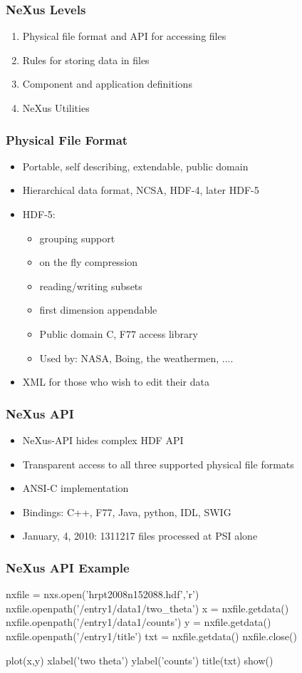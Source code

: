 \documentclass{beamer}
\begin{document}
\begin{frame}
 \frametitle{NeXus Levels }
\begin{enumerate}
\item Physical file format and API for accessing files
\item Rules for storing data in files
\item Component and application definitions
\item NeXus Utilities
\end{enumerate}
\end{frame}


\begin{frame} \frametitle{Physical File Format }
\begin{itemize}
\item Portable, self describing, extendable, public domain
\item Hierarchical data format, NCSA, HDF-4, later HDF-5
\item HDF-5:
\begin{itemize}
\item grouping support
\item on the fly compression
\item reading/writing subsets
\item first dimension appendable
\item Public domain C, F77 access library
\item Used by: NASA, Boing, the weathermen, .... 
\end{itemize}
\item XML for those who wish to edit their data
\end{itemize}
\end{frame}


\begin{frame} \frametitle{NeXus API }
\begin{itemize}
\item NeXus-API hides complex HDF API
\item Transparent access to all three supported physical file formats
\item ANSI-C implementation
\item Bindings: C++, F77, Java, python, IDL, SWIG
\item January, 4, 2010: 1311217 files processed at PSI alone
\end{itemize}
\end{frame}


\begin{frame}[fragile]
 \frametitle{NeXus API Example }
\begin{semiverbatim}
nxfile = nxs.open('hrpt2008n152088.hdf','r')
nxfile.openpath('/entry1/data1/two_theta')
x = nxfile.getdata()
nxfile.openpath('/entry1/data1/counts')
y = nxfile.getdata()
nxfile.openpath('/entry1/title')
txt = nxfile.getdata()
nxfile.close()

plot(x,y)
xlabel('two theta')
ylabel('counts')
title(txt)
show()
\end{semiverbatim}
\end{frame}
\end{document}
